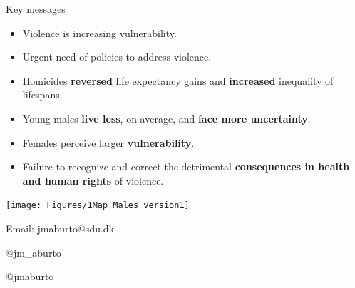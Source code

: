 \documentclass[xcolor={dvipsnames}]{beamer}
\begin{document}
\begin{frame}
\Large{
Key messages \pause
		\begin{itemize}
		\item Violence is increasing vulnerability.\pause
		
	    \item Urgent need of policies to address violence. \pause
		
		\item Homicides \textbf{reversed} life expectancy gains and \textbf{increased} inequality of lifespans. \pause
		
		\item Young males \textbf{live less}, on average, and \textbf{face more uncertainty}.\pause
		
		\item Females perceive larger \textbf{vulnerability}.\pause
		
	    \item Failure to recognize and correct the detrimental \textbf{consequences in health and human rights} of 					violence.
							
		\end{itemize}

}
\end{frame}






\begin{frame}
 \begin{center}





\texttt{[image: Figures/1Map\_Males\_version1]} \\   

	\bigskip

Email: jmaburto@sdu.dk 

\faTwitter \quad  @jm\_aburto 

\faGithub \quad @jmaburto 
 

\end{center}
 
 

\end{frame}
\end{document}
